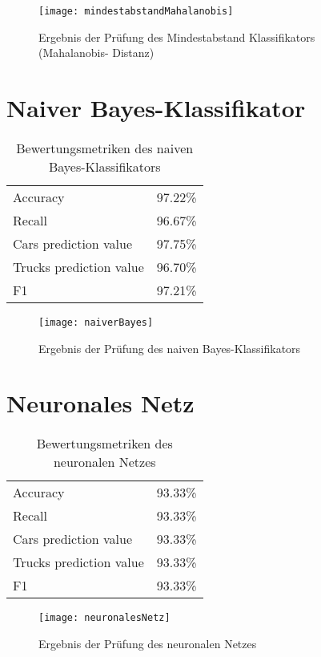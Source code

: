 \begin{figure}[ht]
\centering
\texttt{[image: mindestabstandMahalanobis]}
\caption{Ergebnis der Pr\"ufung des Mindestabstand Klassifikators (Mahalanobis-%
Distanz)}
\label{fig:mahalanobis}
\end{figure}

\section{Naiver Bayes-Klassifikator}

\begin{table}[ht]
\centering
\begin{tabular}{| l | r |}
    \hline
    Accuracy                & 97.22\% \\
    Recall                  & 96.67\% \\
    Cars prediction value   & 97.75\% \\
    Trucks prediction value & 96.70\% \\
    F1                      & 97.21\% \\
    \hline
\end{tabular}
\caption{Bewertungsmetriken des naiven Bayes-Klassifikators}
\label{tab:bayes}
\end{table}

\begin{figure}[ht]
\centering
\texttt{[image: naiverBayes]}
\caption{Ergebnis der Pr\"ufung des naiven Bayes-Klassifikators}
\label{fig:bayes}
\end{figure}

\section{Neuronales Netz}

\begin{table}[ht]
\centering
\begin{tabular}{| l | r |}
    \hline
    Accuracy                & 93.33\% \\
    Recall                  & 93.33\% \\
    Cars prediction value   & 93.33\% \\
    Trucks prediction value & 93.33\% \\
    F1                      & 93.33\% \\
    \hline
\end{tabular}
\caption{Bewertungsmetriken des neuronalen Netzes}
\label{tab:netz}
\end{table}

\begin{figure}[ht]
\centering
\texttt{[image: neuronalesNetz]}
\caption{Ergebnis der Pr\"ufung des neuronalen Netzes}
\label{fig:netz}
\end{figure}